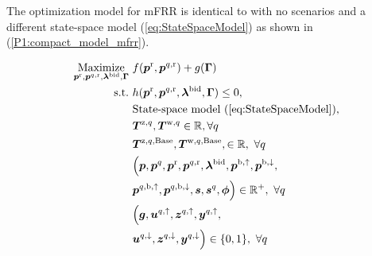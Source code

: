 \documentclass[sigconf]{acmart}
\begin{document}
The optimization model for mFRR is identical to \cite{gade2023load} with no scenarios and a different state-space model (\ref{eq:StateSpaceModel}) as shown in (\ref{P1:compact_model_mfrr}).

\begin{subequations}\label{P1:compact_model_mfrr}
    \begin{align}
        \underset{\bm{p}^{\rm{r}}, \bm{p}^{q,\rm{r}}, \bm{\lambda}^{\rm{bid}}, \bm{\Gamma}}{\text{Maximize}} \  & f(\bm{p}^{\rm{r}}, \bm{p}^{q,\rm{r}}) + g(\bm{\Gamma}) \label{P1:eq1_mfrr}
        \\
        \text{s.t.} \                                                                                           & h(\bm{p}^{\rm{r}}, \bm{p}^{q,\rm{r}}, \bm{\lambda}^{\rm{bid}}, \bm{\Gamma}) \leq 0, \label{P1:eq2_mfrr}                                              \\
        \                                                                                                       & \text{State-space model } (\ref{eq:StateSpaceModel}),  \label{P1:eq3_mfrr}
        \\
        \                                                                                                       & \bm{T}^{\text{z},q}, \bm{T}^{\text{w},q} \in \mathbb{R}, \forall{q} \label{P1:eq4_mfrr}
        \\
        \                                                                                                       & \bm{T}^{\text{z},q,\text{Base}}, \bm{T}^{\text{w},q,\text{Base}}, \in \mathbb{R}, \ \forall{q} \label{P1:eq5_mfrr}
        \\
        \                                                                                                       & \Bigl( \bm{p}, \bm{p}^{q}, \bm{p}^{\rm{r}}, \bm{p}^{q,\rm{r}}, \bm{\lambda}^{\rm{bid}}, \bm{p}^{\rm{b},\uparrow}, \bm{p}^{\rm{b},\downarrow}, \notag \\ & \bm{p}^{q,\rm{b},\uparrow}, \bm{p}^{q,\rm{b},\downarrow}, \bm{s}, \bm{s}^{q}, \bm{\phi} \Bigr) \in \mathbb{R}^{+}, \ \forall{q}  \label{P1:eq6_mfrr}
        \\
        \                                                                                                       & \Bigl( \bm{g}, \bm{u}^{q,\uparrow}, \bm{z}^{q,\uparrow}, \bm{y}^{q,\uparrow}, \notag                                                                 \\ & \bm{u}^{q,\downarrow}, \bm{z}^{q,\downarrow}, \bm{y}^{q,\downarrow} \Bigr) \in \{0,1\}, \ \forall{q} \label{P1:eq7_mfrr}
    \end{align}
\end{subequations}
\end{document}
